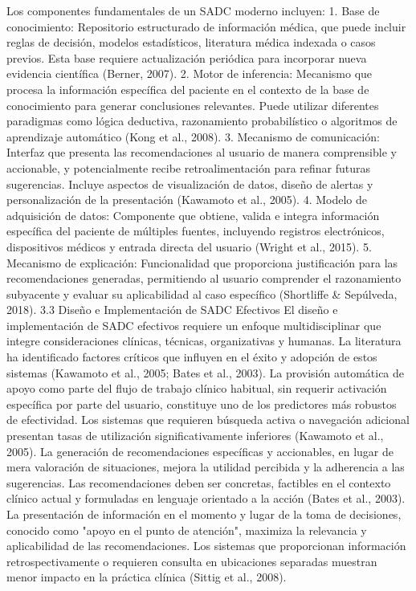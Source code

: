 \documentclass{article}
\begin{document}
\begin{multicols}{2}
Los componentes fundamentales de un SADC moderno incluyen:
1. Base de conocimiento: Repositorio estructurado de información médica, que puede incluir reglas de decisión, modelos estadísticos, literatura médica indexada o casos previos. Esta base requiere actualización periódica para incorporar nueva evidencia científica (Berner, 2007).
2. Motor de inferencia: Mecanismo que procesa la información específica del paciente en el contexto de la base de conocimiento para generar conclusiones relevantes. Puede utilizar diferentes paradigmas como lógica deductiva, razonamiento probabilístico o algoritmos de aprendizaje automático (Kong et al., 2008).
3. Mecanismo de comunicación: Interfaz que presenta las recomendaciones al usuario de manera comprensible y accionable, y potencialmente recibe retroalimentación para refinar futuras sugerencias. Incluye aspectos de visualización de datos, diseño de alertas y personalización de la presentación (Kawamoto et al., 2005).
4. Modelo de adquisición de datos: Componente que obtiene, valida e integra información específica del paciente de múltiples fuentes, incluyendo registros electrónicos, dispositivos médicos y entrada directa del usuario (Wright et al., 2015).
5. Mecanismo de explicación: Funcionalidad que proporciona justificación para las recomendaciones generadas, permitiendo al usuario comprender el razonamiento subyacente y evaluar su aplicabilidad al caso específico (Shortliffe \& Sepúlveda, 2018).
 3.3 Diseño e Implementación de SADC Efectivos
El diseño e implementación de SADC efectivos requiere un enfoque multidisciplinar que integre consideraciones clínicas, técnicas, organizativas y humanas. La literatura ha identificado factores críticos que influyen en el éxito y adopción de estos sistemas (Kawamoto et al., 2005; Bates et al., 2003).
La provisión automática de apoyo como parte del flujo de trabajo clínico habitual, sin requerir activación específica por parte del usuario, constituye uno de los predictores más robustos de efectividad. Los sistemas que requieren búsqueda activa o navegación adicional presentan tasas de utilización significativamente inferiores (Kawamoto et al., 2005).
La generación de recomendaciones específicas y accionables, en lugar de mera valoración de situaciones, mejora la utilidad percibida y la adherencia a las sugerencias. Las recomendaciones deben ser concretas, factibles en el contexto clínico actual y formuladas en lenguaje orientado a la acción (Bates et al., 2003).
La presentación de información en el momento y lugar de la toma de decisiones, conocido como "apoyo en el punto de atención", maximiza la relevancia y aplicabilidad de las recomendaciones. Los sistemas que proporcionan información retrospectivamente o requieren consulta en ubicaciones separadas muestran menor impacto en la práctica clínica (Sittig et al., 2008).

\end{multicols}
\end{document}
